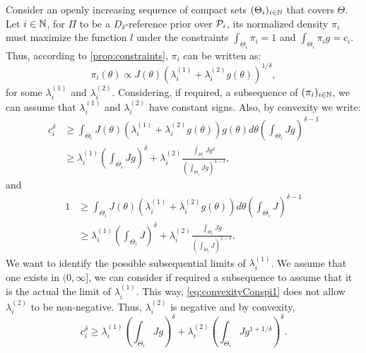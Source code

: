   Consider an openly increasing sequence of compact sets $(\Theta_i)_{i\in\mathbb{N}}$ that covers $\Theta$. Let $i\in\mathbb{N}$, for $\varPi$ to be a $D_\delta$-reference prior over $\mathcal{P}_i$, its normalized density $\pi_i$ %
  must maximize the function $l$ under the constraints $\int_{\Theta_i}\pi_i=1$ and $\int_{\Theta_i}\pi_i g=c_i$. Thus, according to \cref{prop:constraints}, $\pi_i$ can be written as:
     \begin{equation}
         \pi_i(\theta)\propto J(\theta)(\lambda_i^{(1)}+\lambda_i^{(2)}g(\theta))^{1/\delta},
     \end{equation}
 for some $\lambda_i^{(1)}$ and $\lambda_i^{(2)}$.
 Considering, if required, a subsequence of $(\pi_i)_{i\in\mathbb{N}}$, we can assume that $\lambda_i^{(1)}$ and $\lambda_i^{(2)}$ have constant signs.
 Also, by convexity we write:%
 \newcommand{\li}[1]{\lambda_i^{(#1)}}%
     \begin{align}\label{eq:convexityConsCpig}
         c_i^\delta  & \geq \int_{\Theta_i}J(\theta)(\li1+\li2g(\theta))g(\theta)d\theta\left(\int_{\Theta_i}Jg\right)^{\delta-1}  \\
         &\geq \li1\left(\int_{\Theta_i}Jg\right)^{\delta} + \li2\frac{\int_{\Theta_i}Jg^{2} }{\left(\int_{\Theta_i}Jg\right)^{1-\delta}},\nonumber
     \end{align}
    and
    \begin{align}\label{eq:convexityConspi1}
        1 & \geq \int_{\Theta_i}J(\theta)(\li1+\li2g(\theta))d\theta\left(\int_{\Theta_i}J\right)^{\delta-1} \\
        &\geq \li1\left(\int_{\Theta_i}J\right)^\delta + \li2 \frac{\int_{\Theta_i}Jg}{\left(\int_{\Theta_i}J\right)^{1-\delta}}  . \nonumber
    \end{align}
We want to identify the possible subsequential limits of $\li1$. 
We assume that one exists in $(0,\infty]$, we can consider if required a subsequence to assume that it is the actual the limit of $\li1$. 
This way, \cref{eq:convexityConspi1} does not allow $\li2$ to be non-negative.
Thus, $\li2$ is negative and by convexity,
    \begin{equation}\label{eq:convixity2l2leq0}
        c_i^\delta \geq \li1\left(\int_{\Theta_i} Jg\right)^\delta +\li2 \left(\int_{\Theta_i} Jg^{1+1/\delta}\right)^\delta .
    \end{equation}
